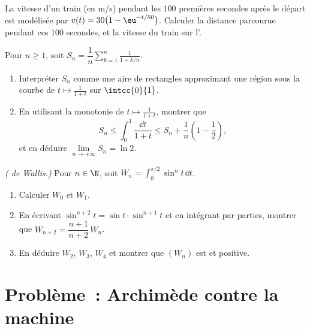 \begin{exercise}[$\star\star$]\label{exo:g12:integ:7}
La vitesse d'un train (en m/s) pendant les $100$ premières secondes après
le départ est modélisée par $v(t) = 30\bigl(1 - \eu^{-t/50}\bigr)$.
Calculer la distance parcourue pendant ces $100$ secondes, et la vitesse
 du train sur l'.
\end{exercise}

\begin{exercise}[$\star\star\star$]\label{exo:g12:integ:8}
Pour $n \geq 1$, soit $S_n = \dfrac1n \displaystyle\sum_{k=1}^{n} \frac{1}{1 + k/n}$.
\begin{enumerate}
  \item Interpréter $S_n$ comme une aire de rectangles approximant une
        région sous la courbe de $t \mapsto \frac{1}{1+t}$ sur
        $\intcc{0}{1}$.
  \item En utilisant la monotonie de $t \mapsto \frac{1}{1+t}$, montrer que
        \[
        S_n \leq \int_0^1 \frac{\dd t}{1+t} \leq S_n + \frac1n\left(1 - \frac12\right),
        \]
        et en déduire $\lim\limits_{n\to+\infty} S_n = \ln 2$.
\end{enumerate}
\end{exercise}

\begin{exercise}[$\star\star\star$]\label{exo:g12:integ:9}
\emph{( de Wallis.)} Pour $n \in \N$, soit
$W_n = \displaystyle\int_0^{\pi/2} \sin^n t\,\dd t$.
\begin{enumerate}
  \item Calculer $W_0$ et $W_1$.
  \item En écrivant $\sin^{n+2}t = \sin t \cdot \sin^{n+1} t$ et en
        intégrant par parties, montrer que
        $W_{n+2} = \dfrac{n+1}{n+2}\,W_n$.
  \item En déduire $W_2$, $W_3$, $W_4$ et montrer que $(W_n)$ est
         et positive.
\end{enumerate}
\end{exercise}

\section{Problème~: Archimède contre la machine}

